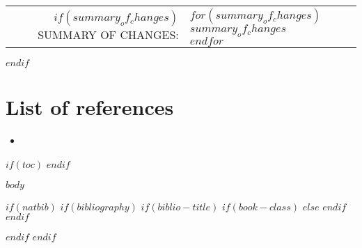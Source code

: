 \documentclass[$if(fontsize)$$fontsize$,$endif$$if(lang)$$babel-lang$,$endif$$if(papersize)$$papersize$paper,$endif$$for(classoption)$$classoption$$sep$,$endfor$]{$documentclass$}
\begin{document}
\begin{minipage}{\textwidth}
\begin{center}
\begin{tabular}{ r l }
                $if(summary_of_changes)$
                {\color{gray}SUMMARY OF CHANGES:}           & \parbox[t]{8cm}{$for(summary_of_changes)$ $summary_of_changes$ \vspace{2mm} \\ $endfor$} \\

                \null & \null \\
                $endif$


            \end{tabular}
        \end{center}
    \end{minipage}
    \vfill
    \newpage
$endif$


	\vspace*{5em}
	\section*{List of references}
	\begin{itemize}
			\item {} \\
	\end{itemize}
	\newpage



\vspace*{1cm}

$if(toc)$
    {
        \hypersetup{linkcolor=$if(toccolor)$$toccolor$$else$black$endif$}
        \setcounter{tocdepth}{$toc-depth$}
        \tableofcontents
        \clearpage
        \newpage
    }
$endif$

\pagestyle{fancy}
$body$
\newpage

$if(natbib)$
    $if(bibliography)$
        $if(biblio-title)$
            $if(book-class)$
                \renewcommand\bibname{$biblio-title$}
            $else$
                \renewcommand\refname{$biblio-title$}
            $endif$
        $endif$
        
        \newpage
    $endif$
$endif$
\end{document}
